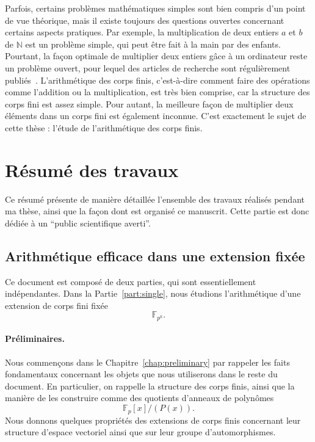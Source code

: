 Parfois, certains problèmes mathématiques simples sont bien compris d'un point
de vue théorique, mais il existe toujours des questions ouvertes concernant
certains aspects pratiques. Par exemple, la multiplication de deux entiers $a$
et $b$ de $\mathbb{N}$ est un problème simple, qui peut être fait à la main par
des enfants. Pourtant, la façon optimale de multiplier deux entiers
g\^ace à un ordinateur reste un problème ouvert, pour lequel des articles de
recherche sont régulièrement publiés~\cite{HVDH19}. L'arithmétique des corps
finis, c'est-à-dire comment faire des opérations comme l'addition ou la
multiplication, est très bien comprise, car la structure des corps fini est
assez simple. Pour autant, la meilleure façon de multiplier deux éléments dans
un corps fini est également inconnue. C'est exactement le sujet de cette thèse :
l'étude de l'arithmétique des corps finis.

\section*{Résumé des travaux}

Ce résumé présente de manière détaillée l'ensemble des travaux réalisés pendant
ma thèse, ainsi que la façon dont est organisé ce manuscrit. Cette partie est
donc dédiée à un ``public scientifique averti''.

\subsection*{Arithmétique efficace dans une extension fixée}

Ce document est composé de deux parties, qui sont essentiellement indépendantes.
Dans la Partie~\ref{part:single}, nous étudions l'arithmétique d'une extension
de corps fini fixée
\[
  \mathbb{F}_{p^{k}}.
\]
\paragraph{Préliminaires.} Nous commençons dans le
Chapitre~\ref{chap:preliminary} par rappeler les faits fondamentaux concernant
les objets que nous utiliserons dans le reste du document. En particulier, on
rappelle la structure des corps finis, ainsi que la manière de les construire
comme des quotients d'anneaux de polynômes
\[
  \mathbb{F}_p[x]/(P(x)).
\]
Nous donnons quelques propriétés des extensions de corps finis concernant leur
structure d'espace vectoriel ainsi que sur leur groupe d'automorphismes.

